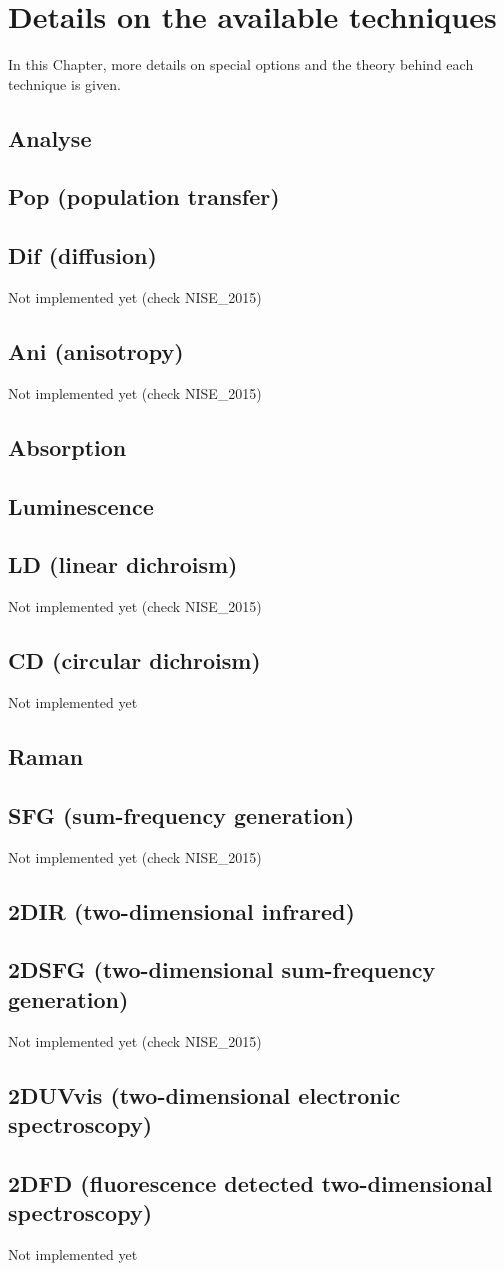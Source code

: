 \chapter{Details on the available techniques}
In this Chapter, more details on special options and the theory behind each technique is given.
\section{Analyse}
\section{Pop (population transfer)}
\section{Dif (diffusion)}
Not implemented yet (check NISE\_2015)
\section{Ani (anisotropy)}
Not implemented yet (check NISE\_2015)
\section{Absorption}
\section{Luminescence}
\section{LD (linear dichroism)}
Not implemented yet (check NISE\_2015)
\section{CD (circular dichroism)}
 Not implemented yet
\section{Raman}
\section{SFG (sum-frequency generation)}
Not implemented yet (check NISE\_2015)
\section{2DIR (two-dimensional infrared)}
\section{2DSFG (two-dimensional sum-frequency generation)}
 Not implemented yet (check NISE\_2015)
\section{2DUVvis (two-dimensional electronic spectroscopy)}
\section{2DFD (fluorescence detected two-dimensional spectroscopy)}
 Not implemented yet